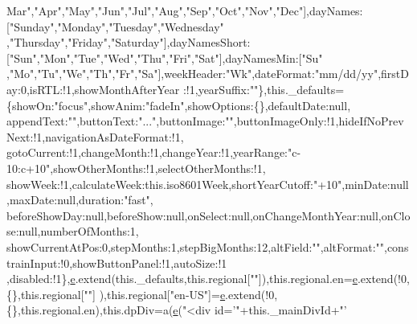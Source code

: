 \begin{DoxyCode}
{      Mar"},\textcolor{stringliteral}{"Apr"},\textcolor{stringliteral}{"May"},\textcolor{stringliteral}{"Jun"},\textcolor{stringliteral}{"Jul"},\textcolor{stringliteral}{"Aug"},\textcolor{stringliteral}{"Sep"},\textcolor{stringliteral}{"Oct"},\textcolor{stringliteral}{"Nov"},\textcolor{stringliteral}{"Dec"}],dayNames:[\textcolor{stringliteral}{"Sunday"},\textcolor{stringliteral}{"Monday"},\textcolor{stringliteral}{"Tuesday"},\textcolor{stringliteral}{"Wednesday"}
      ,\textcolor{stringliteral}{"Thursday"},\textcolor{stringliteral}{"Friday"},\textcolor{stringliteral}{"Saturday"}],dayNamesShort:[\textcolor{stringliteral}{"Sun"},\textcolor{stringliteral}{"Mon"},\textcolor{stringliteral}{"Tue"},\textcolor{stringliteral}{"Wed"},\textcolor{stringliteral}{"Thu"},\textcolor{stringliteral}{"Fri"},\textcolor{stringliteral}{"Sat"}],dayNamesMin:[\textcolor{stringliteral}{"Su"}
      ,\textcolor{stringliteral}{"Mo"},\textcolor{stringliteral}{"Tu"},\textcolor{stringliteral}{"We"},\textcolor{stringliteral}{"Th"},\textcolor{stringliteral}{"Fr"},\textcolor{stringliteral}{"Sa"}],weekHeader:\textcolor{stringliteral}{"Wk"},dateFormat:\textcolor{stringliteral}{"mm/dd/yy"},firstDay:0,isRTL:!1,showMonthAfterYear
      :!1,yearSuffix:\textcolor{stringliteral}{""}\},this.\_defaults=\{showOn:\textcolor{stringliteral}{"focus"},showAnim:\textcolor{stringliteral}{"fadeIn"},showOptions:\{\},defaultDate:null,
      appendText:\textcolor{stringliteral}{""},buttonText:\textcolor{stringliteral}{"..."},buttonImage:\textcolor{stringliteral}{""},buttonImageOnly:!1,hideIfNoPrevNext:!1,navigationAsDateFormat:!1,
      gotoCurrent:!1,changeMonth:!1,changeYear:!1,yearRange:\textcolor{stringliteral}{"c-10:c+10"},showOtherMonths:!1,selectOtherMonths:!1,
      showWeek:!1,calculateWeek:this.iso8601Week,shortYearCutoff:\textcolor{stringliteral}{"+10"},minDate:null,maxDate:null,duration:\textcolor{stringliteral}{"fast"},
      beforeShowDay:null,beforeShow:null,onSelect:null,onChangeMonthYear:null,onClose:null,numberOfMonths:1,
      showCurrentAtPos:0,stepMonths:1,stepBigMonths:12,altField:\textcolor{stringliteral}{""},altFormat:\textcolor{stringliteral}{""},constrainInput:!0,showButtonPanel:!1,autoSize:!1
      ,disabled:!1\},\hyperlink{jquery-ui_8min_8js_a2c038346d47955cbe2cb91e338edd7e1}{e}.extend(this.\_defaults,this.regional[\textcolor{stringliteral}{""}]),this.regional.en=\hyperlink{jquery-ui_8min_8js_a2c038346d47955cbe2cb91e338edd7e1}{e}.extend(!0,\{\},this.regional[\textcolor{stringliteral}{""}]
      ),this.regional[\textcolor{stringliteral}{"en-US"}]=\hyperlink{jquery-ui_8min_8js_a2c038346d47955cbe2cb91e338edd7e1}{e}.extend(!0,\{\},\textcolor{keyword}{this}.regional.en),this.dpDiv=a(\hyperlink{jquery-ui_8min_8js_a2c038346d47955cbe2cb91e338edd7e1}{e}(\textcolor{stringliteral}{"<div id='"}+this.\_mainDivId+\textcolor{stringliteral}{"'
}
\end{DoxyCode}
